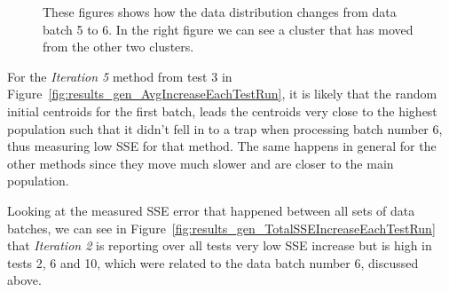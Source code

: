 \begin{figure}[ht!]
        \begin{center}
        \end{center}
    \caption{These figures shows how the data distribution changes from data batch 5 to 6. In the right figure we can see a cluster that has moved from the other two clusters.}
   \label{fig:results_gensubfigures}
\end{figure}

For the \textit{Iteration 5} method from test 3 in Figure~\ref{fig:results_gen_AvgIncreaseEachTestRun}, it is likely that the random initial centroids for the first batch, leads the centroids very close to the highest population such that it didn't fell in to a trap when processing batch number 6, thus measuring low SSE for that method. The same happens in general for the other methods since they move much slower and are closer to the main population.

Looking at the measured SSE error that happened between all sets of data batches, we can see in Figure~\ref{fig:results_gen_TotalSSEIncreaseEachTestRun} that \textit{Iteration 2} is reporting over all tests very low SSE increase but is high in tests 2, 6 and 10, which were related to the data batch number 6, discussed above.

